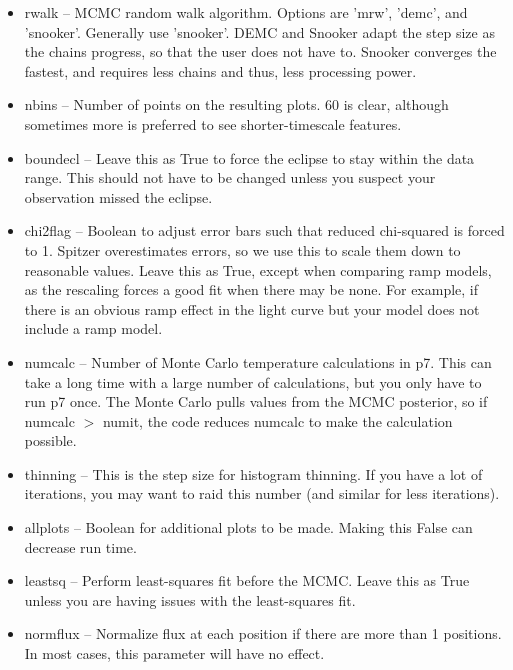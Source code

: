 \documentclass[letterpaper,12pt]{article}
\begin{document}
\begin{itemize}
\item rwalk -- MCMC random walk algorithm. Options are 'mrw', 'demc',
  and 'snooker'. Generally use 'snooker'. DEMC and Snooker adapt the
  step size as the chains progress, so that the user does not have to.
  Snooker converges the fastest, and requires less chains and thus,
  less processing power.

\item nbins -- Number of points on the resulting plots. 60 is clear,
  although sometimes more is preferred to see shorter-timescale
  features.

\item boundecl -- Leave this as True to force the eclipse to stay
  within the data range. This should not have to be changed unless you
  suspect your observation missed the eclipse.

\item chi2flag -- Boolean to adjust error bars such that reduced
  chi-squared is forced to 1. Spitzer overestimates errors, so we use
  this to scale them down to reasonable values. Leave this as True,
  except when comparing ramp models, as the rescaling forces a good
  fit when there may be none.  For example, if there is an obvious
  ramp effect in the light curve but your model does not include a
  ramp model.

\item numcalc -- Number of Monte Carlo temperature calculations in
  p7. This can take a long time with a large number of calculations,
  but you only have to run p7 once. The Monte Carlo pulls values from
  the MCMC posterior, so if numcalc $>$ numit, the code reduces
  numcalc to make the calculation possible.

\item thinning -- This is the step size for histogram thinning. If you
  have a lot of iterations, you may want to raid this number (and similar
  for less iterations).

\item allplots -- Boolean for additional plots to be made. Making this
  False can decrease run time.

\item leastsq -- Perform least-squares fit before the MCMC. Leave this as True
  unless you are having issues with the least-squares fit.

\item normflux -- Normalize flux at each position if there are more than 1
  positions. In most cases, this parameter will have no effect.


\end{itemize}
\end{document}
